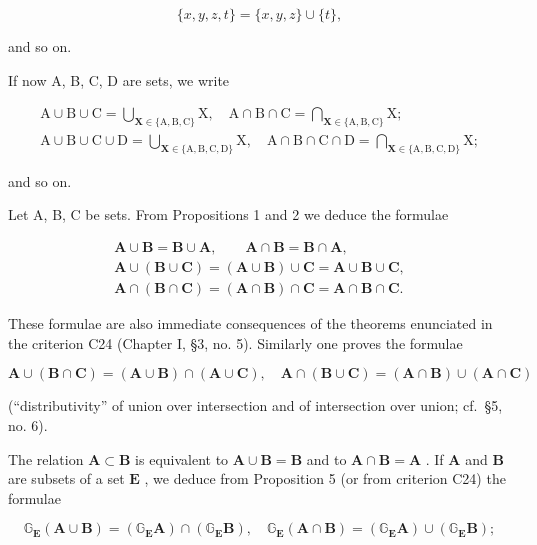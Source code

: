\[
\{x, y, z, t \} = \{x, y, z \} \cup \{t \},
\]

and so on.

If now A, B, C, D are sets, we write

\[
\begin{array}{c} \mathrm {A \cup B \cup C = \bigcup_ {\mathbf {X} \in \{\mathrm{A,B,C} \}} X, \quad A \cap B \cap C = \bigcap_ {\mathbf {X} \in \{\mathrm{A,B,C} \}} X;} \\ \mathrm {A \cup B \cup C \cup D = \bigcup_ {\mathbf {X} \in \{\mathrm{A,B,C,D} \}} X, \quad A \cap B \cap C \cap D = \bigcap_ {\mathbf {X} \in \{\mathrm{A,B,C,D} \}} X;} \end{array}
\]

and so on.

Let A, B, C be sets. From Propositions 1 and 2 we deduce the formulae

\[
\begin{array}{c} \mathbf {A} \cup \mathbf {B} = \mathbf {B} \cup \mathbf {A}, \qquad \mathbf {A} \cap \mathbf {B} = \mathbf {B} \cap \mathbf {A}, \\ \mathbf {A} \cup (\mathbf {B} \cup \mathbf {C}) = (\mathbf {A} \cup \mathbf {B}) \cup \mathbf {C} = \mathbf {A} \cup \mathbf {B} \cup \mathbf {C}, \\ \mathbf {A} \cap (\mathbf {B} \cap \mathbf {C}) = (\mathbf {A} \cap \mathbf {B}) \cap \mathbf {C} = \mathbf {A} \cap \mathbf {B} \cap \mathbf {C}. \end{array}
\]

These formulae are also immediate consequences of the theorems enunciated in the criterion C24 (Chapter I, §3, no. 5). Similarly one proves the formulae

\[
\mathbf {A} \cup (\mathbf {B} \cap \mathbf {C}) = (\mathbf {A} \cup \mathbf {B}) \cap (\mathbf {A} \cup \mathbf {C}), \quad \mathbf {A} \cap (\mathbf {B} \cup \mathbf {C}) = (\mathbf {A} \cap \mathbf {B}) \cup (\mathbf {A} \cap \mathbf {C})
\]

(``distributivity'' of union over intersection and of intersection over union; cf.~§5, no. 6).

The relation \(\mathbf{A} \subset \mathbf{B}\) is equivalent to \(\mathbf{A} \cup \mathbf{B} = \mathbf{B}\) and to \(\mathbf{A} \cap \mathbf{B} = \mathbf{A}\) . If \(\mathbf{A}\) and \(\mathbf{B}\) are subsets of a set \(\mathbf{E}\) , we deduce from Proposition 5 (or from criterion C24) the formulae

\[
\mathbb {G} _ {\mathbf {E}} (\mathbf {A} \cup \mathbf {B}) = \left(\mathbb {G} _ {\mathbf {E}} \mathbf {A}\right) \cap \left(\mathbb {G} _ {\mathbf {E}} \mathbf {B}\right), \quad \mathbb {G} _ {\mathbf {E}} (\mathbf {A} \cap \mathbf {B}) = \left(\mathbb {G} _ {\mathbf {E}} \mathbf {A}\right) \cup \left(\mathbb {G} _ {\mathbf {E}} \mathbf {B}\right);
\]

